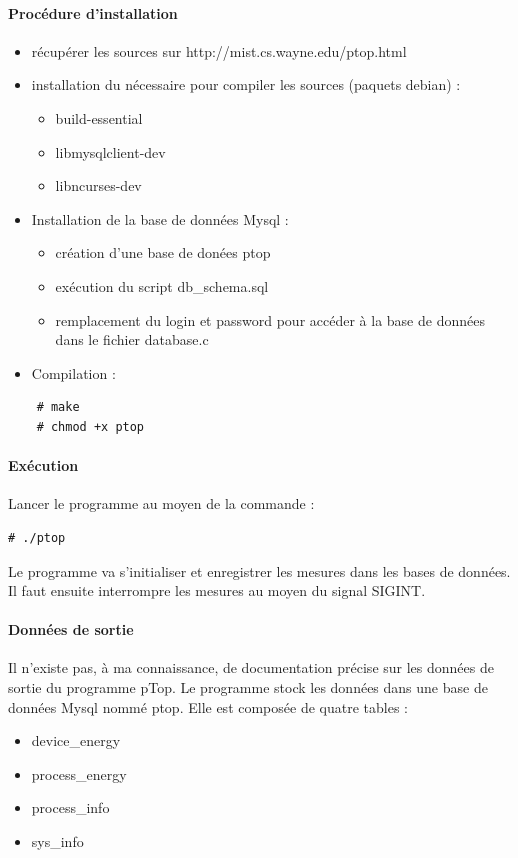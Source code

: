 \documentclass[a4paper, 11pt]{report}
\begin{document}
\paragraph{Procédure d'installation}
\begin{itemize}
    \item récupérer les sources sur http://mist.cs.wayne.edu/ptop.html
    \item installation du nécessaire pour compiler les sources (paquets debian) :
    \begin{itemize}
	\item build-essential
	\item libmysqlclient-dev
	\item libncurses-dev
    \end{itemize}
    \item Installation de la base de données Mysql :
    \begin{itemize}
	\item création d’une base de donées ptop
	\item exécution du script db\_schema.sql
	\item remplacement du login et password pour accéder à la base de données dans le fichier database.c
    \end{itemize}
    \item Compilation :
\end{itemize}

\begin{verbatim}
	# make
	# chmod +x ptop
\end{verbatim}

\paragraph{Exécution}
Lancer le programme au moyen de la commande :

\begin{verbatim}
# ./ptop
\end{verbatim}

Le programme va s'initialiser et enregistrer les mesures dans les bases de données. Il faut ensuite interrompre les mesures au moyen du signal SIGINT.

\paragraph{Données de sortie}
Il n’existe pas, à ma connaissance, de documentation précise sur les données de sortie du programme pTop.  Le programme stock les données dans une base de données Mysql nommé ptop. Elle est composée de quatre tables :
\begin{itemize}
	\item device\_energy
	\item process\_energy
	\item process\_info
	\item sys\_info
\end{itemize}
\end{document}
